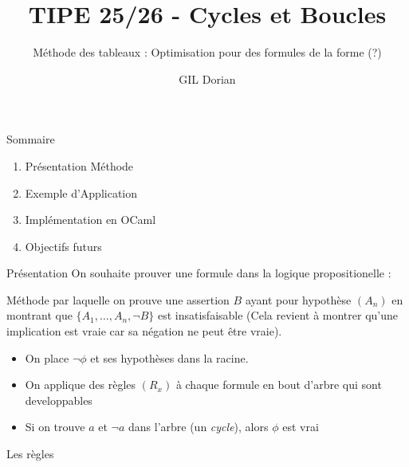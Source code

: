\documentclass{beamer}
\title{TIPE 25/26 - Cycles et Boucles}
\author{GIL Dorian}
\subtitle{Méthode des tableaux : Optimisation pour des formules de la forme (?)}
\date{}
\begin{document}
\begin{frame}
\titlepage
\end{frame}

\begin{frame}{Sommaire}
\begin{enumerate}
    \item Présentation Méthode
    \item Exemple d'Application
    \item Implémentation en OCaml
    \item Objectifs futurs
\end{enumerate}
\end{frame}

\begin{frame}{Présentation}
    On souhaite prouver une formule dans la logique propositionelle :
    \begin{definition}
        Méthode par laquelle on prouve une assertion $B$ ayant pour hypothèse $(A_n)$ en montrant
        que $\{A_1,\dots,A_n, \lnot B\}$ est insatisfaisable (Cela revient à montrer qu'une implication est vraie car sa négation ne peut être vraie).
    \end{definition}
    \pause
    \begin{itemize}
        \item On place $\lnot\phi$ et ses hypothèses dans la racine.
        \item On applique des règles $(R_x)$ à chaque formule en bout d'arbre qui sont developpables
        \item Si on trouve $a$ et $\lnot a$ dans l'arbre (un \textit{cycle}), alors $\phi$ est vrai
    \end{itemize}
    \pause
    Les règles
\end{frame}
\end{document}
